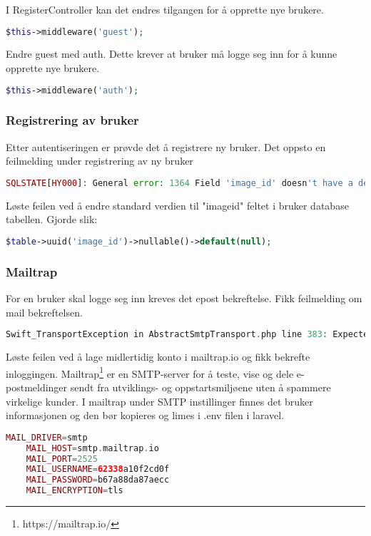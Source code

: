 I RegisterController kan det endres tilgangen for å opprette nye brukere.
\begin{lstlisting}[language=PHP]
    $this->middleware('guest');
\end{lstlisting}
Endre guest med auth. Dette krever at bruker må logge seg inn for å kunne opprette nye brukere.
\begin{lstlisting}[language=PHP]
    $this->middleware('auth');
\end{lstlisting}

\subsubsection{ Registrering av bruker}
Etter autentiseringen er prøvde det å registrere ny bruker. Det oppsto en feilmelding under registrering av ny bruker
\begin{lstlisting}[language=PHP]
    SQLSTATE[HY000]: General error: 1364 Field 'image_id' doesn't have a default value
\end{lstlisting}  
Løste feilen ved å endre standard verdien til "imageid" feltet i bruker database tabellen. Gjorde slik:

\begin{lstlisting}[language=PHP]
    $table->uuid('image_id')->nullable()->default(null);
\end{lstlisting} 

\subsubsection{Mailtrap}
For en bruker skal logge seg inn kreves det epost bekreftelse.
Fikk feilmelding om mail bekreftelsen.
\begin{lstlisting}[language=PHP]
    Swift_TransportException in AbstractSmtpTransport.php line 383: Expected response code 250 but got code "530", with message "530 5.7.1 Authentication required
\end{lstlisting}
    
Løste feilen ved å lage midlertidig konto i mailtrap.io og fikk bekrefte inloggingen.
Mailtrap\footnote{{https://mailtrap.io/}} er en SMTP-server for å teste, vise og dele e-postmeldinger sendt fra utviklings- og oppstartsmiljøene uten å spammere virkelige kunder.
I mailtrap under SMTP instillinger finnes det bruker informasjonen og den bør kopieres og limes i .env filen i laravel.

\begin{lstlisting}[language=PHP]
    MAIL_DRIVER=smtp
    MAIL_HOST=smtp.mailtrap.io
    MAIL_PORT=2525
    MAIL_USERNAME=62338a10f2cd0f
    MAIL_PASSWORD=b67a88da87aecc
    MAIL_ENCRYPTION=tls
\end{lstlisting}

